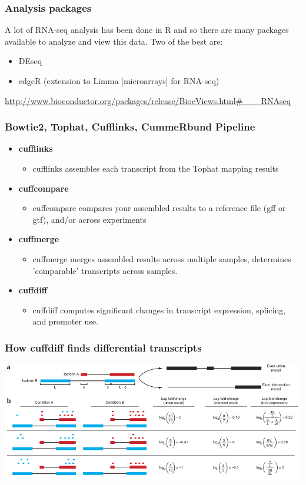 \documentclass[pdf]{beamer}
\begin{document}
\begin{frame}
\frametitle{Analysis packages}
A lot of RNA-seq analysis has been done in R and so there are many packages available to analyze and view this data. Two of the best are:\\
\begin{itemize}
\item DEseq
\item edgeR (extension to Limma [microarrays] for RNA-seq)
\end{itemize}
\vspace{0.2in}
\url{http://www.bioconductor.org/packages/release/BiocViews.html\#___RNAseq}
\end{frame}

\begin{frame}
\frametitle{Bowtie2, Tophat, Cufflinks, CummeRbund Pipeline}
\begin{itemize}
\item \textbf{cufflinks}
\begin{itemize}
\item cufflinks assembles each transcript from the Tophat mapping results
\end{itemize}
\item \textbf{cuffcompare}
\begin{itemize}
\item cuffcompare compares your assembled results to a reference file (gff or gtf), and/or across experiments
\end{itemize}
\item \textbf{cuffmerge}
\begin{itemize}
\item cuffmerge merges assembled results across multiple samples, determines 'comparable' transcripts across samples.
\end{itemize}
\item \textbf{cuffdiff}
\begin{itemize}
\item cuffdiff computes significant changes in transcript expression, splicing, and promoter use.
\end{itemize}
\end{itemize}
\end{frame}

\begin{frame}
\frametitle{How cuffdiff finds differential transcripts}
\begin{center}
\includegraphics[scale=0.35]{Figures/cuffdiff.png} 
\end{center}
\end{frame}
\end{document}
